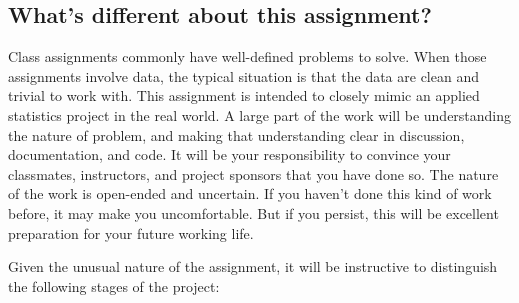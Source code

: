 \documentclass[11pt, oneside]{article}   	%
\begin{document}
\subsection{What's different about this assignment?}

Class assignments commonly have well-defined problems to solve.  When those
assignments involve data, the typical situation is that the data are clean and
trivial to work with.  This assignment is intended to closely mimic an
applied statistics project in the real world.  A large part of the work will be
understanding the nature of problem, and making that understanding clear in
discussion, documentation, and code.  It will be your responsibility to
convince your classmates, instructors, and project sponsors that you have done
so.  The nature of the work is open-ended and uncertain.  If you haven't done
this kind of work before, it may make you uncomfortable.  But if you persist,
this will be excellent preparation for your future working life.

Given the unusual nature of the assignment, it will be instructive to distinguish
the following stages of the project:
\end{document}
